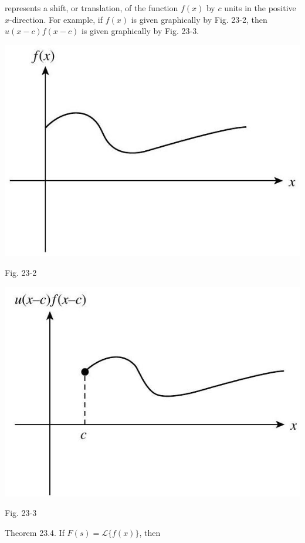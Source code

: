 \documentclass[10pt]{article}
\begin{document}
represents a shift, or translation, of the function $f(x)$ by $c$ units in the positive $x$-direction. For example, if $f(x)$ is given graphically by Fig. 23-2, then $u(x-c) f(x-c)$ is given graphically by Fig. 23-3.

\begin{center}
\includegraphics[max width=\textwidth]{2024_04_03_5bb5b4275a64cb9887d1g-252}
\end{center}

Fig. 23-2

\begin{center}
\includegraphics[max width=\textwidth]{2024_04_03_5bb5b4275a64cb9887d1g-252(1)}
\end{center}

Fig. 23-3

Theorem 23.4. If $F(s)=\mathscr{L}\{f(x)\}$, then
\end{document}
